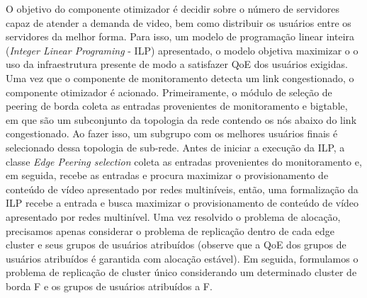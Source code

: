 O objetivo do componente otimizador é decidir sobre o número de servidores capaz de atender a demanda de video, bem como distribuir os usuários entre os servidores da melhor forma. Para isso, um modelo de programação linear inteira (\textit{Integer Linear Programing} - ILP) apresentado, o modelo objetiva maximizar o o uso da infraestrutura presente de modo a satisfazer QoE dos usuários exigidas. 
Uma vez que o componente de monitoramento detecta um link congestionado, o componente otimizador é acionado. Primeiramente, o módulo de seleção de peering de borda coleta as entradas provenientes de monitoramento e bigtable, em que são um subconjunto da topologia da rede contendo os nós abaixo do link congestionado. Ao fazer isso, um subgrupo com os melhores usuários finais é selecionado dessa topologia de sub-rede.
Antes de iniciar a execução da ILP, a classe \textit{Edge Peering selection} coleta as entradas provenientes do monitoramento e, em seguida, recebe as entradas e procura maximizar o provisionamento de conteúdo de vídeo apresentado por redes multiníveis, então, uma formalização da ILP recebe a entrada e busca maximizar o provisionamento de conteúdo de vídeo apresentado por redes multinível. 
Uma vez resolvido o problema de alocação, precisamos apenas considerar o problema de replicação dentro de cada edge cluster e seus grupos de usuários atribuídos (observe que a QoE dos grupos de usuários atribuídos é garantida com alocação estável). Em seguida, formulamos o problema de replicação de cluster único considerando um determinado cluster de borda F e os grupos de usuários atribuídos a F.


